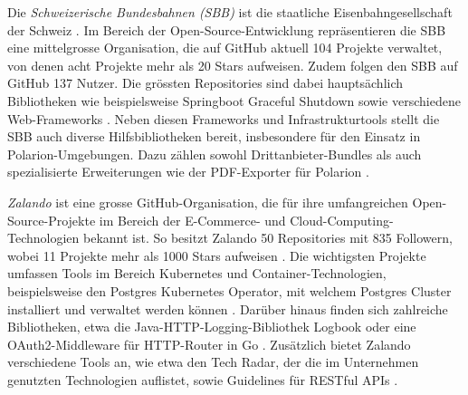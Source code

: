 Die \textit{Schweizerische Bundesbahnen (SBB)} ist die staatliche Eisenbahngesellschaft der Schweiz \parencite{uvek_verkehr_energie_und_kommunikation_eidgenossisches_departement_fur_umwelt_schweizerische_nodate}. Im Bereich der Open-Source-Entwicklung repräsentieren die SBB eine mittelgrosse Organisation, die auf GitHub aktuell 104 Projekte verwaltet, von denen acht Projekte mehr als 20 Stars aufweisen. Zudem folgen den SBB auf GitHub 137 Nutzer. Die grössten Repositories sind dabei hauptsächlich Bibliotheken wie beispielsweise Springboot Graceful Shutdown sowie verschiedene Web-Frameworks \parencite{noauthor_schweizerischebundesbahnenspringboot-graceful-shutdown_2025} \parencite{noauthor_schweizerischebundesbahnenscion-workbench_2025} \parencite{noauthor_schweizerischebundesbahnenscion-microfrontend-platform_2025}. Neben diesen Frameworks und Infrastrukturtools stellt die SBB auch diverse Hilfsbibliotheken bereit, insbesondere für den Einsatz in Polarion-Umgebungen. Dazu zählen sowohl Drittanbieter-Bundles \parencite{noauthor_schweizerischebundesbahnenchsbbpolarionthirdpartybundles_nodate} als auch spezialisierte Erweiterungen wie der PDF-Exporter für Polarion \parencite{noauthor_schweizerischebundesbahnenchsbbpolarionextensionpdf-exporter_2025}\parencite{noauthor_swiss_nodate}.


\textit{Zalando} ist eine grosse GitHub-Organisation, die für ihre umfangreichen Open-Source-Projekte im Bereich der E-Commerce- und Cloud-Computing-Technologien bekannt ist. So besitzt Zalando 50 Repositories mit 835 Followern, wobei 11 Projekte mehr als 1000 Stars aufweisen \parencite{noauthor_zalando_nodate}. Die wichtigsten Projekte umfassen Tools im Bereich Kubernetes und Container-Technologien, beispielsweise den Postgres Kubernetes Operator, mit welchem Postgres Cluster installiert und verwaltet werden können \parencite{noauthor_zalandopostgres-operator_2025}. Darüber hinaus finden sich zahlreiche Bibliotheken, etwa die Java-HTTP-Logging-Bibliothek Logbook oder eine OAuth2-Middleware für HTTP-Router in Go \parencite{noauthor_zalandologbook_2025} \parencite{noauthor_zalandogin-oauth2_nodate}. Zusätzlich bietet Zalando verschiedene Tools an, wie etwa den Tech Radar, der die im Unternehmen genutzten Technologien auflistet, sowie Guidelines für RESTful APIs \parencite{noauthor_zalandotech-radar_nodate} \parencite{noauthor_zalandorestful-api-guidelines_nodate}.
